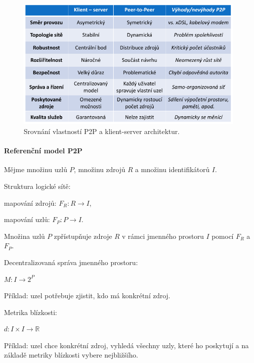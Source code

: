 \begin{figure}[H]
    \centering
    \includegraphics[width=0.9\linewidth]{p2p_vs_client_server.pdf}
    \caption{Srovnání vlastností P2P a klient-server architektur.}
\end{figure}

\paragraph*{Referenční model P2P} \begin{compactitem}
    \item Mějme množinu uzlů $P$, množinu zdrojů $R$ a množinu identifikátorů $I$.

    \item Struktura logické sítě: \begin{compactitem}
        \item mapování zdrojů: $F_R : R \rightarrow I$,
        \item mapování uzlů: $F_P : P \rightarrow I$.
        \item Množina uzlů $P$ zpřístupňuje zdroje $R$ v rámci jmenného prostoru $I$ pomocí $F_R$ a $F_P$.
    \end{compactitem}

    \item Decentralizovaná správa jmenného prostoru: \begin{compactitem}
        \item $M : I \rightarrow 2^P$
        \item Příklad: uzel potřebuje zjistit, kdo má konkrétní zdroj.
    \end{compactitem}

    \item Metrika blízkosti: \begin{compactitem}
        \item $d : I \times I \rightarrow \mathbb{R}$
        \item Příklad: uzel chce konkrétní zdroj, vyhledá všechny uzly, které ho poskytují a na základě metriky blízkosti vybere nejbližšího.
    \end{compactitem}
\end{compactitem}


